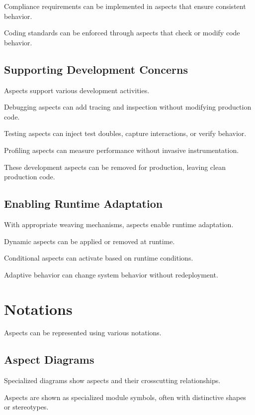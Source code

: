 \documentclass[11pt]{article}
\begin{document}
Compliance requirements can be implemented in aspects that ensure consistent behavior.

Coding standards can be enforced through aspects that check or modify code behavior.

\subsection{Supporting Development Concerns}

Aspects support various development activities.

Debugging aspects can add tracing and inspection without modifying production code.

Testing aspects can inject test doubles, capture interactions, or verify behavior.

Profiling aspects can measure performance without invasive instrumentation.

These development aspects can be removed for production, leaving clean production code.

\subsection{Enabling Runtime Adaptation}

With appropriate weaving mechanisms, aspects enable runtime adaptation.

Dynamic aspects can be applied or removed at runtime.

Conditional aspects can activate based on runtime conditions.

Adaptive behavior can change system behavior without redeployment.

\section{Notations}

Aspects can be represented using various notations.

\subsection{Aspect Diagrams}

Specialized diagrams show aspects and their crosscutting relationships.

Aspects are shown as specialized module symbols, often with distinctive shapes or stereotypes.
\end{document}
